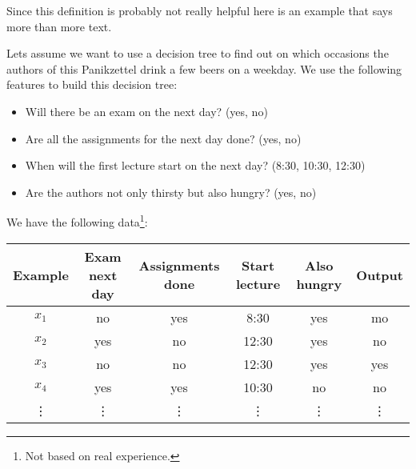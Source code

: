 \documentclass{panikzettel}
\begin{document}
Since this definition is probably not really helpful here is an example that says more than more text.

Lets assume we want to use a decision tree to find out on which occasions the authors of this Panikzettel drink a few beers on a weekday. We use the following features to build this decision tree:
\begin{itemize}
\item Will there be an exam on the next day? (yes, no)
\item Are all the assignments for the next day done? (yes, no)
\item When will the first lecture start on the next day? (8:30, 10:30, 12:30)
\item Are the authors not only thirsty but also hungry? (yes, no)
\end{itemize}


We have the following data\footnote{Not based on real experience.}:\\
\begin{tabular}{|c|c|c|c|c|c|}
\hline
Example & Exam next day & Assignments done & Start lecture & Also hungry & Output \\
\hline
\hline
$x_1$ & no & yes & 8:30 & yes & mo \\
\hline
$x_2$ & yes & no & 12:30 & yes & no \\
\hline
$x_3$ & no & no & 12:30 & yes & yes \\
\hline
$x_4$ & yes & yes & 10:30 & no & no \\
\hline
\vdots & \vdots & \vdots & \vdots & \vdots & \vdots \\
\end{tabular}
\end{document}
